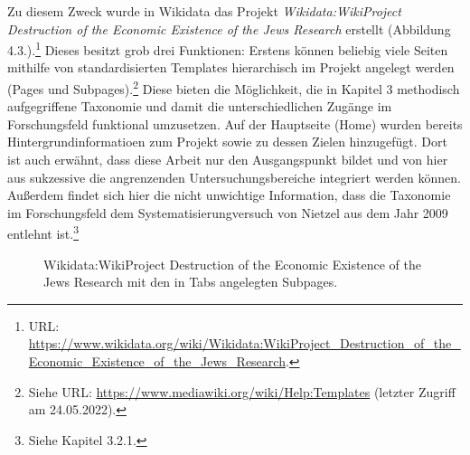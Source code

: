 Zu diesem Zweck wurde in Wikidata das Projekt \textit{Wikidata:WikiProject Destruction of the Economic Existence of the Jews Research} erstellt (Abbildung 4.3.).\footnote{URL: \url{https://www.wikidata.org/wiki/Wikidata:WikiProject_Destruction_of_the_Economic_Existence_of_the_Jews_Research}.} Dieses besitzt grob drei Funktionen: Erstens können beliebig viele Seiten mithilfe von standardisierten Templates hierarchisch im Projekt angelegt werden (Pages und Subpages).\footnote{Siehe URL: \url{https://www.mediawiki.org/wiki/Help:Templates} (letzter Zugriff am 24.05.2022).} Diese bieten die Möglichkeit, die in Kapitel 3 methodisch aufgegriffene Taxonomie und damit die unterschiedlichen Zugänge im Forschungsfeld funktional umzusetzen. Auf der Hauptseite (Home) wurden bereits Hintergrundinformatioen zum Projekt sowie zu dessen Zielen hinzugefügt. Dort ist auch erwähnt, dass diese Arbeit nur den Ausgangspunkt bildet und von hier aus sukzessive die angrenzenden Untersuchungsbereiche integriert werden können. Außerdem findet sich hier die nicht unwichtige Information, dass die Taxonomie im Forschungsfeld dem Systematisierungversuch von Nietzel aus dem Jahr 2009 entlehnt ist.\footnote{Siehe Kapitel 3.2.1.}    

\begin{figure}[h]
    \centering
    \caption{Wikidata:WikiProject Destruction of the Economic Existence of the Jews Research mit den in Tabs angelegten Subpages.}
    \label{fig:x cubed graph}
\end{figure}

